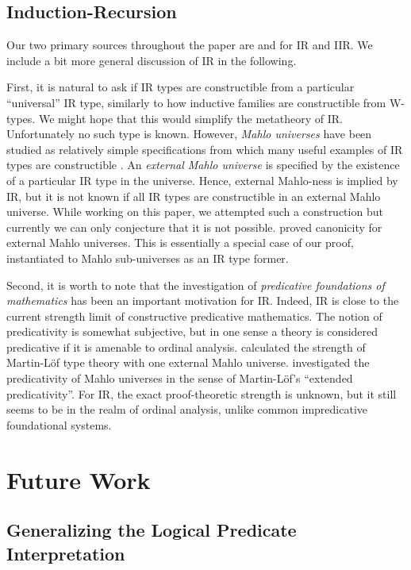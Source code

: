 \documentclass[acmsmall,screen,review,anonymous]{acmart}
\begin{document}
\subsection{Induction-Recursion} Our two primary sources throughout the paper are
\cite{DBLP:journals/apal/DybjerS03} and \cite{DBLP:journals/jlp/DybjerS06} for IR and IIR. We include
a bit more general discussion of IR in the following.

First, it is natural to ask if IR types are constructible from a particular ``universal'' IR type,
similarly to how inductive families are constructible from W-types. We might hope that this would
simplify the metatheory of IR. Unfortunately no such type is known. However, \emph{Mahlo universes}
have been studied as relatively simple specifications from which many useful examples of IR types
are constructible \cite{setzer00mahlo}. An \emph{external Mahlo universe} is specified by the
existence of a particular IR type in the universe. Hence, external Mahlo-ness is implied by IR, but
it is not known if all IR types are constructible in an external Mahlo universe. While working on
this paper, we attempted such a construction but currently we can only conjecture that it is not
possible. \citet{mahlo-canonicity} proved canonicity for external Mahlo universes. This is
essentially a special case of our proof, instantiated to Mahlo sub-universes as an IR type former.

Second, it is worth to note that the investigation of \emph{predicative foundations of mathematics}
has been an important motivation for IR. Indeed, IR is close to the current strength limit of
constructive predicative mathematics. The notion of predicativity is somewhat
subjective, but in one sense a theory is considered predicative if it is amenable to ordinal
analysis. \citet{setzer00mahlo} calculated the strength of Martin-Löf type theory with one external
Mahlo universe. \citet{DBLP:journals/logcom/DybjerS24} investigated the predicativity of Mahlo
universes in the sense of Martin-Löf's ``extended predicativity''. For IR, the exact proof-theoretic
strength is unknown, but it still seems to be in the realm of ordinal analysis, unlike common
impredicative foundational systems.

\section{Future Work}\label{sec:future-work}

\subsection{Generalizing the Logical Predicate Interpretation} \label{sec:generalizing-the-logical-predicate}
\end{document}
